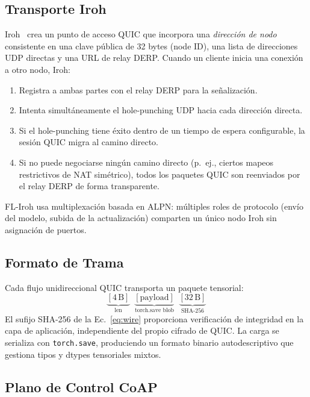\documentclass[journal]{IEEEtran}
\begin{document}
\subsection{Transporte Iroh}

Iroh~\cite{iroh2024} crea un punto de acceso QUIC que incorpora una \emph{dirección de nodo} consistente en una clave pública de 32 bytes (node ID), una lista de direcciones UDP directas y una URL de relay DERP. Cuando un cliente inicia una conexión a otro nodo, Iroh:
\begin{enumerate}
    \item Registra a ambas partes con el relay DERP para la señalización.
    \item Intenta simultáneamente el hole-punching UDP hacia cada dirección directa.
    \item Si el hole-punching tiene éxito dentro de un tiempo de espera configurable, la sesión QUIC migra al camino directo.
    \item Si no puede negociarse ningún camino directo (p.~ej., ciertos mapeos restrictivos de NAT simétrico), todos los paquetes QUIC son reenviados por el relay DERP de forma transparente.
\end{enumerate}

FL-Iroh usa multiplexación basada en ALPN: múltiples roles de protocolo (envío del modelo, subida de la actualización) comparten un único nodo Iroh sin asignación de puertos.

\subsection{Formato de Trama}

Cada flujo unidireccional QUIC transporta un paquete tensorial:
\begin{equation}
\underbrace{[4\,\text{B}]}_{\text{len}} \;\; \underbrace{[\text{payload}]}_{\text{torch.save blob}} \;\; \underbrace{[32\,\text{B}]}_{\text{SHA-256}}
\label{eq:wire}
\end{equation}
El sufijo SHA-256 de la Ec.~\eqref{eq:wire} proporciona verificación de integridad en la capa de aplicación, independiente del propio cifrado de QUIC. La carga se serializa con \texttt{torch.save}, produciendo un formato binario autodescriptivo que gestiona tipos y dtypes tensoriales mixtos.

\subsection{Plano de Control CoAP}
\end{document}
